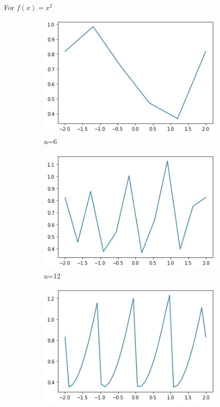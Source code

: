 \documentclass{article}
\begin{document}
\paragraph{} For $f(x) = x^2$
\begin{figure}[h!]
	\centering
	\begin{subfigure}[b]{0.2\linewidth}
		\includegraphics[width=\linewidth]{img/f2_n6.png}
		\caption{n=6}
	\end{subfigure}
	\begin{subfigure}[b]{0.2\linewidth}
		\includegraphics[width=\linewidth]{img/f2_n12.png}
		\caption{n=12}
	\end{subfigure}
	\begin{subfigure}[b]{0.2\linewidth}
		\includegraphics[width=\linewidth]{img/f2_n36.png}

\end{subfigure}
\end{figure}
\end{document}
